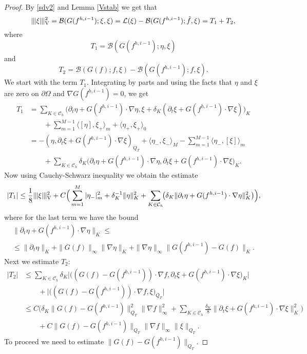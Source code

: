 \documentclass[reqno,a4paper]{amsart}
\theoremstyle{remark}
\numberwithin{equation}{section}
\newcommand{\Vnorm}[1]{|\mkern-1mu|\mkern-1mu|#1|\mkern-1mu|\mkern-1mu|_\mathrm{V}}
\newcommand{\sprod}[2]{\langle #1, #2 \rangle}
\def\d{\partial}
\def\B{\mathcal{B}}
\def\L{\mathcal{L}}
\def\sumKV{\sum_{K\in\mathcal{C}_h}\!\!}
\begin{document}
\begin{proof}
By \eqref{sdv2} and Lemma \ref{Vstab} we get that
\[
\Vnorm{\xi}^2=\B(G(f^{h,i-1});\xi,\xi)=\L(\xi)-\B(G(f^{h,i-1});\tilde{f},\xi)=T_1+T_2,
\]
where
\[
T_1 = \B (G(f^{h,i-1}); \eta, \xi)
\]
and
\[
T_2 = \B (G(f); f, \xi) - \B (G(f^{h,i-1}); f, \xi).
\]
We start with the term $T_1$.
Integrating by parts and using the facts that $\eta$ and $\xi$ are zero on $\d\Omega$
and $\nabla G(f^{h,i-1})=0$, we get
\[
\begin{split}
T_1&=\sumKV
\big(\d_t\eta+G(f^{h,i-1})\cdot\nabla\eta,\xi+\delta_K(\d_t\xi+G(f^{h,i-1})\cdot\nabla\xi)\big)_K\\
&\qquad+\sum_{m=1}^{M-1}\sprod{[ \eta ]}{\xi_+}_m + \sprod{\eta_+}{\xi_+}_0\\
&=-(\eta,\d_t\xi+G(f^{h,i-1})\cdot\nabla\xi)_{Q_T}+\sprod{\eta_-}{\xi_-}_M
-\sum_{m=1}^{M-1}\sprod{\eta_-}{[\xi]}_m\\
&\qquad
+\sumKV\delta_K\big(\d_t\eta+G(f^{h,i-1})\cdot\nabla\eta,\d_t\xi+G(f^{h,i-1})\cdot\nabla\xi\big)_K.
\end{split}
\]
Now using Cauchy-Schwarz inequality we obtain the estimate
\begin{equation*}
|T_1|\leq\frac{1}{8}\Vnorm{\xi}^2+C\Big(\sum_{m=1}^M|\eta_-|_m^2+\delta_K^{-1}\|\eta\|_K^2+
\sumKV\big(\delta_K\|\d_t\eta+G(f^{h,i-1})\cdot\nabla\eta\|_K^2\big)\Big),
\end{equation*}
where for the last term we have the bound
\begin{multline}\label{eta_bound}
\|\d_t\eta+G(f^{h,i-1})\cdot\nabla\eta\|_K\leq\\
\leq\|\d_t\eta\|_K+\|G(f)\|_\infty\|\nabla\eta\|_K+\|\nabla\eta\|_\infty\|G(f^{h,i-1})-G(f)\|_K.
\end{multline}
Next we estimate $T_2$:
\begin{equation*}
\begin{split}
|T_2|&\leq\sumKV\delta_K\big|\big((G(f)-G(f^{h,i-1}))\cdot\nabla f,
\d_t\xi+G(f^{h,i-1})\cdot\nabla\xi\big)_K\big|\\
&\qquad+\big|\big((G(f)-G(f^{h,i-1}))\cdot\nabla f,\xi\big)_{Q_T}\big|\\
&\leq C\Big(\delta_K\|G(f)-G(f^{h,i-1})\|_{Q_T}^2\|\nabla f\|_\infty^2
+\!\!\sumKV\frac{\delta_K}{8}\|\d_t\xi+G(f^{h,i-1})\cdot\nabla\xi\|_K^2\Big)\\
&\qquad+
C\|G(f)-G(f^{h,i-1})\|_{Q_T}\|\nabla f\|_\infty\|\xi\|_{Q_T}.
\end{split}
\end{equation*}
To proceed we need to estimate $\|G(f)-G(f^{h,i-1})\|_{Q_T}$.

\end{proof}
\end{document}
